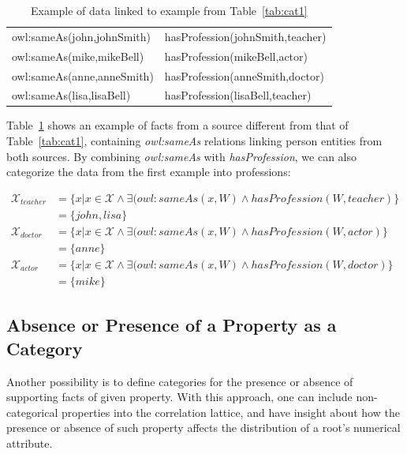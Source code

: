 \begin{table}[h!]
 \begin{center}
 \caption{Example of data linked to example from Table~\ref{tab:cat1}}
  \begin{tabular}{l l}
    \toprule
    owl:sameAs(john,johnSmith)& hasProfession(johnSmith,teacher)  \\
    owl:sameAs(mike,mikeBell) & hasProfession(mikeBell,actor) 	 \\
    owl:sameAs(anne,anneSmith)& hasProfession(anneSmith,doctor)	 \\
    owl:sameAs(lisa,lisaBell) & hasProfession(lisaBell,teacher)  \\
    \bottomrule
  \end{tabular}
 \label{tab:cat2}
 \end{center}
\end{table}

Table~\ref{tab:cat2} shows an example of facts from a source different from that of Table~\ref{tab:cat1}, containing
\emph{owl:sameAs} relations linking person entities from both sources. By combining \emph{owl:sameAs} with
\emph{hasProfession}, we can also categorize the data from the first example into
professions:

\begin{align*}
\mathcal{X}_{teacher}&=\{ x|x \in \mathcal{X} \wedge \exists (owl:sameAs(x,W) \wedge hasProfession(W,teacher)\} \\
  &=\{john,lisa\} \\
\mathcal{X}_{doctor}&=\{ x|x \in \mathcal{X} \wedge \exists (owl:sameAs(x,W) \wedge hasProfession(W,actor)\} \\
  &=\{anne\} \\
\mathcal{X}_{actor}&=\{ x|x \in \mathcal{X} \wedge \exists (owl:sameAs(x,W) \wedge hasProfession(W,doctor)\} \\
  &=\{mike\}
\end{align*}


\subsection{Absence or Presence of a Property as a Category}

Another possibility is to define categories for the presence or absence of supporting facts of given property. With
this approach, one can include non-categorical properties into the correlation lattice, and have insight about how
the presence or absence of such property affects the distribution of a root's numerical attribute.

